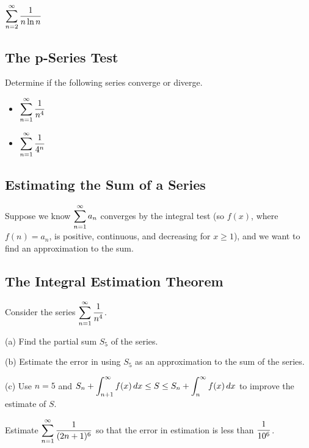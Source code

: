 \documentclass[12pt]{article}
\begin{document}
\newpage

\Example $\displaystyle\sum_{n=2}^\infty\frac{1}{n\ln n}$

\newpage

\subsection*{The p-Series Test}

\Example Determine if the following series converge or diverge.

\begin{multicols}{2}
\begin{itemize}
	\item[\tc{1}] $\displaystyle\sum_{n=1}^\infty\frac{1}{n^4}$
	\item[\tc{2}] $\displaystyle\sum_{n=1}^\infty\frac{1}{4^n}$
\end{itemize}
\end{multicols}

\vspace{30mm}

\subsection*{Estimating the Sum of a Series}

Suppose we know $\displaystyle\sum_{n=1}^\infty a_n$ converges by the integral test (so $f(x)$, where $f(n)=a_n$, is positive, continuous, and decreasing for $x\geq 1$), and we want to find an approximation to the sum.

\vfill


\vfill


\newpage


\subsection*{The Integral Estimation Theorem}

\vspace{50mm}

\Example Consider the series $\displaystyle\sum_{n=1}^\infty\frac{1}{n^4}$.

(a) Find the partial sum $S_5$ of the series.
	
	\vspace{30mm}
	
(b) Estimate the error in using $S_5$ as an approximation to the sum of the series.
	
\vfill

(c) Use $n=5$ and $S_n+\displaystyle\int_{n+1}^\infty f(x)\,dx\leq S\leq S_n+\int_n^\infty f(x)\,dx$ to improve the estimate of $S$. 

\vfill

\newpage

\Example Estimate $\displaystyle\sum_{n=1}^\infty\frac{1}{(2n+1)^6}$ so that the error in estimation is less than $\displaystyle\frac{1}{10^6}$.
\end{document}
